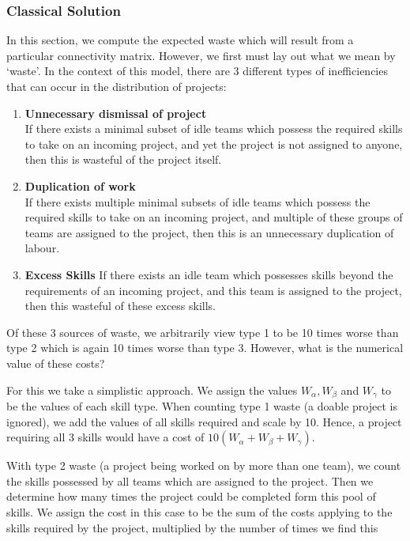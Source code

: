 \subsubsection{Classical Solution}

In this section, we compute the expected waste which will result from a particular connectivity matrix. However, we first must lay out what we mean by `waste'. In the context of this model, there are 3 different types of inefficiencies that can occur in the distribution of projects:

\begin{enumerate}
	\item \textbf{Unnecessary dismissal of project}\\
	If there exists a minimal subset of idle teams which possess the required skills to take on an incoming project, and yet the project is not assigned to anyone, then this is wasteful of the project itself.
	
	\item \textbf{Duplication of work}\\
	If there exists multiple minimal subsets of idle teams which possess the required skills to take on an incoming project, and multiple of these groups of teams are assigned to the project, then this is an unnecessary duplication of labour.
	
	\item \textbf{Excess Skills}
	If there exists an idle team which possesses skills beyond the requirements of an incoming project, and this team is assigned to the project, then this wasteful of these excess skills.
\end{enumerate}

Of these 3 sources of waste, we arbitrarily view type 1 to be 10 times worse than type 2 which is again 10 times worse than type 3. However, what is the numerical value of these costs?

For this we take a simplistic approach. We assign the values $W_\alpha, W_\beta$ and $W_\gamma$ to be the values of each skill type. When counting type 1 waste (a doable project is ignored), we add the values of all skills required and scale by 10. Hence, a project requiring all 3 skills would have a cost of $10(W_\alpha+W_\beta+W_\gamma)$.

With type 2 waste (a project being worked on by more than one team), we count the skills possessed by all teams which are assigned to the project. Then we determine how many times the project could be completed form this pool of skills. We assign the cost in this case to be the sum of the costs applying to the skills required by the project, multiplied by the number of times we find this 

